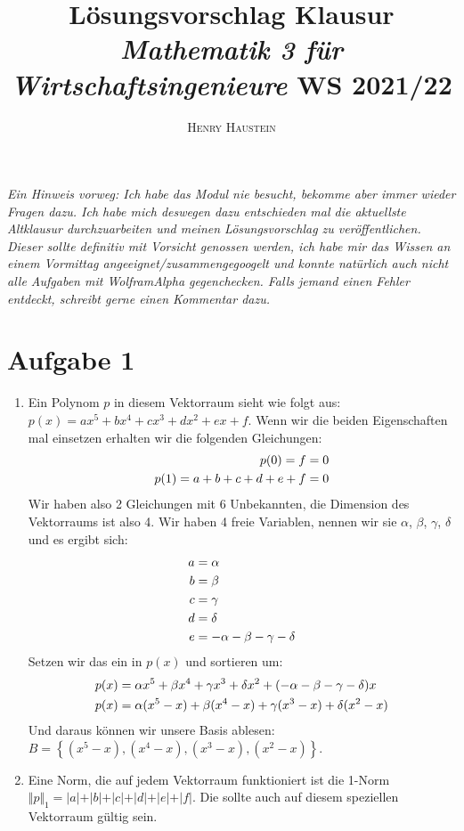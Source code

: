 \documentclass{article}
\title{\textbf{Lösungsvorschlag Klausur \textit{Mathematik 3 für Wirtschaftsingenieure} WS 2021/22}}
\author{\textsc{Henry Haustein}}
\date{}
\begin{document}
	\maketitle
	
	\textit{Ein Hinweis vorweg: Ich habe das Modul nie besucht, bekomme aber immer wieder Fragen dazu. Ich habe mich deswegen dazu entschieden mal die aktuellste Altklausur durchzuarbeiten und meinen Lösungsvorschlag zu veröffentlichen. Dieser sollte definitiv mit Vorsicht genossen werden, ich habe mir das Wissen an einem Vormittag angeeignet/zusammengegoogelt und konnte natürlich auch nicht alle Aufgaben mit WolframAlpha gegenchecken. Falls jemand einen Fehler entdeckt, schreibt gerne einen Kommentar dazu.}
	
	\section*{Aufgabe 1}
	\begin{enumerate}[label=(\alph*)]
		\item Ein Polynom $p$ in diesem Vektorraum sieht wie folgt aus: $p(x) = ax^5 + bx^4 + cx^3 + dx^2 + ex + f$. Wenn wir die beiden Eigenschaften mal einsetzen erhalten wir die folgenden Gleichungen:
		\begin{align}
			p(0) = f &= 0 \notag \\
			p(1) = a + b + c + d + e + f &= 0 \notag
		\end{align}
		Wir haben also 2 Gleichungen mit 6 Unbekannten, die Dimension des Vektorraums ist also 4. Wir haben 4 freie Variablen, nennen wir sie $\alpha$, $\beta$, $\gamma$, $\delta$ und es ergibt sich:
		\begin{align}
			a &= \alpha \notag \\
			b &= \beta \notag \\
			c &= \gamma \notag \\
			d &= \delta \notag \\
			e &= -\alpha - \beta - \gamma - \delta \notag
		\end{align}
		Setzen wir das ein in $p(x)$ und sortieren um:
		\begin{align}
			p(x) &= \alpha x^5 + \beta x^4 + \gamma x^3 + \delta x^2 + (-\alpha - \beta - \gamma - \delta)x \notag \\
			p(x) &= \alpha(x^5 - x) + \beta (x^4 - x) + \gamma (x^3 - x) + \delta (x^2 - x) \notag
		\end{align}
		Und daraus können wir unsere Basis ablesen: $B = \left\lbrace \left(x^5-x\right), \left(x^4-x\right), \left(x^3-x\right), \left(x^2-x\right) \right\rbrace$.
		\item Eine Norm, die auf jedem Vektorraum funktioniert ist die 1-Norm $\Vert p\Vert_1 = \vert a\vert + \vert b\vert + \vert c\vert + \vert d\vert + \vert e\vert + \vert f\vert$. Die sollte auch auf diesem speziellen Vektorraum gültig sein.
	\end{enumerate}
\end{document}
